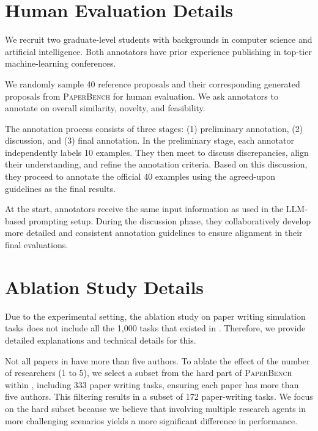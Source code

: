 \section{Human Evaluation Details}
\label{sec:human-eval}
We recruit two graduate-level students with backgrounds in computer science and artificial intelligence. Both annotators have prior experience publishing in top-tier machine-learning conferences.

We randomly sample 40 reference proposals and their corresponding generated proposals from \textsc{PaperBench} for human evaluation. We ask annotators to annotate on overall similarity, novelty, and feasibility.

The annotation process consists of three stages: (1) preliminary annotation, (2) discussion, and (3) final annotation. In the preliminary stage, each annotator independently labels 10 examples. They then meet to discuss discrepancies, align their understanding, and refine the annotation criteria. Based on this discussion, they proceed to annotate the official 40 examples using the agreed-upon guidelines as the final results.

At the start, annotators receive the same input information as used in the LLM-based prompting setup. During the discussion phase, they collaboratively develop more detailed and consistent annotation guidelines to ensure alignment in their final evaluations.


\section{Ablation Study Details}
\label{ablation-study-details}
Due to the experimental setting, the ablation study on paper writing simulation tasks does not include all the 1,000 tasks that existed in \benchname. Therefore, we provide detailed explanations and technical details for this.

Not all papers in \benchname have more than five authors. To ablate the effect of the number of researchers (1 to 5), we select a subset from the hard part of \textsc{PaperBench} within \benchname, including 333 paper writing tasks, ensuring each paper has more than five authors. This filtering results in a subset of 172 paper-writing tasks. We focus on the hard subset because we believe that involving multiple research agents in more challenging scenarios yields a more significant difference in performance.

